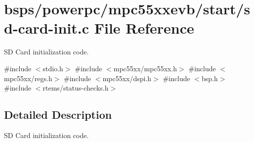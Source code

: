 \hypertarget{sd-card-init_8c}{}\section{bsps/powerpc/mpc55xxevb/start/sd-\/card-\/init.c File Reference}
\label{sd-card-init_8c}


SD Card initialization code.  


{\ttfamily \#include $<$stdio.\+h$>$}\newline
{\ttfamily \#include $<$mpc55xx/mpc55xx.\+h$>$}\newline
{\ttfamily \#include $<$mpc55xx/regs.\+h$>$}\newline
{\ttfamily \#include $<$mpc55xx/dspi.\+h$>$}\newline
{\ttfamily \#include $<$bsp.\+h$>$}\newline
{\ttfamily \#include $<$rtems/status-\/checks.\+h$>$}\newline


\subsection{Detailed Description}
SD Card initialization code. 


